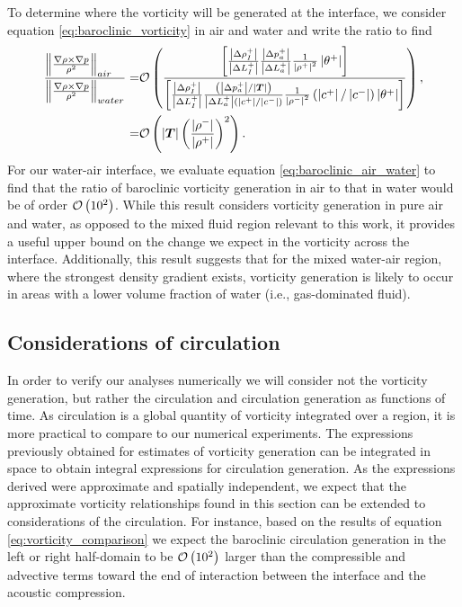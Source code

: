 To determine where the vorticity will be generated at the interface,
we consider equation \eqref{eq:baroclinic_vorticity} in air and water
and write the ratio to find
\begin{align}%
\label{eq:baroclinic_air_water}%
\frac{\norm{\frac{\nabla\rho\times\nabla p}{\rho^2}}_{air\quad}}{\norm{\frac{\nabla\rho\times\nabla p}{\rho^2}}_{water}}
=&\orderof{\frac{\left[\frac{\abs{\Delta \rho_I^+}}{\abs{\Delta L_I^+}}\frac{\abs{\Delta p_a^+}}{\abs{\Delta L_a^+}}\frac{1}{\abs{\rho^+}^2}\abs{\theta^+}\right]}
{\left[\frac{\abs{\Delta \rho_I^+}}{\abs{\Delta L_I^+}}\frac{\left(\abs{\Delta p_a^+}/\abs{\bs{T}}\right)}{\abs{\Delta L_a^+}\left(\abs{c^+}/\abs{c^-}\right)}\frac{1}{\abs{\rho^-}^2}\left(\abs{c^+}/\abs{c^-}\right)\abs{\theta^+}\right]}},\nonumber\\%
=&\orderof{\abs{\bs{T}}\left(\frac{\abs{\rho^-}}{\abs{\rho^+}}\right)^2}.%
\end{align}
For our water-air interface, we evaluate equation
\eqref{eq:baroclinic_air_water} to find that the ratio of baroclinic
vorticity generation in air to that in water would be of order
$\mathcal{O}\left(10^2\right)$. While this result considers vorticity generation in
pure air and water, as opposed to the mixed fluid region relevant to
this work, it provides a useful upper bound on the change we expect in
the vorticity across the interface. Additionally, this result suggests
that for the mixed water-air region, where the strongest density
gradient exists, vorticity generation is likely to occur in areas with
a lower volume fraction of water (i.e., gas-dominated fluid).

\subsection{Considerations of circulation}
In order to verify our analyses numerically we will consider not the
vorticity generation, but rather the circulation and circulation
generation as functions of time. As circulation is a global quantity
of vorticity integrated over a region, it is more practical to compare
to our numerical experiments. The expressions previously obtained for
estimates of vorticity generation can be integrated in space to obtain
integral expressions for circulation generation. As the expressions
derived were approximate and spatially independent, we expect that the
approximate vorticity relationships found in this section can be
extended to considerations of the circulation. For instance, based on
the results of equation \eqref{eq:vorticity_comparison} we expect the
baroclinic circulation generation in the left or right half-domain to
be $\mathcal{O}\left(10^2\right)$ larger than the compressible and advective terms
toward the end of interaction between the interface and the acoustic
compression.

